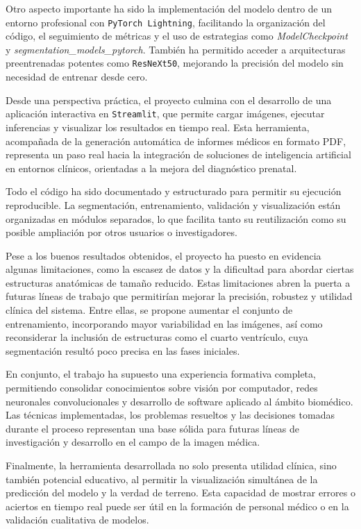 Otro aspecto importante ha sido la implementación del modelo dentro de un entorno profesional con \texttt{PyTorch Lightning}, facilitando la organización del código, el seguimiento de métricas y el uso de estrategias como \textit{ModelCheckpoint} y \textit{segmentation\_models\_pytorch}. También ha permitido acceder a arquitecturas preentrenadas potentes como \texttt{ResNeXt50}, mejorando la precisión del modelo sin necesidad de entrenar desde cero.


Desde una perspectiva práctica, el proyecto culmina con el desarrollo de una aplicación interactiva en \texttt{Streamlit}, que permite cargar imágenes, ejecutar inferencias y visualizar los resultados en tiempo real. Esta herramienta, acompañada de la generación automática de informes médicos en formato PDF, representa un paso real hacia la integración de soluciones de inteligencia artificial en entornos clínicos, orientadas a la mejora del diagnóstico prenatal.

Todo el código ha sido documentado y estructurado para permitir su ejecución reproducible. La segmentación, entrenamiento, validación y visualización están organizadas en módulos separados, lo que facilita tanto su reutilización como su posible ampliación por otros usuarios o investigadores.

Pese a los buenos resultados obtenidos, el proyecto ha puesto en evidencia algunas limitaciones, como la escasez de datos y la dificultad para abordar ciertas estructuras anatómicas de tamaño reducido. Estas limitaciones abren la puerta a futuras líneas de trabajo que permitirían mejorar la precisión, robustez y utilidad clínica del sistema. Entre ellas, se propone aumentar el conjunto de entrenamiento, incorporando mayor variabilidad en las imágenes, así como reconsiderar la inclusión de estructuras como el cuarto ventrículo, cuya segmentación resultó poco precisa en las fases iniciales.

En conjunto, el trabajo ha supuesto una experiencia formativa completa, permitiendo consolidar conocimientos sobre visión por computador, redes neuronales convolucionales y desarrollo de software aplicado al ámbito biomédico. Las técnicas implementadas, los problemas resueltos y las decisiones tomadas durante el proceso representan una base sólida para futuras líneas de investigación y desarrollo en el campo de la imagen médica.

Finalmente, la herramienta desarrollada no solo presenta utilidad clínica, sino también potencial educativo, al permitir la visualización simultánea de la predicción del modelo y la verdad de terreno. Esta capacidad de mostrar errores o aciertos en tiempo real puede ser útil en la formación de personal médico o en la validación cualitativa de modelos.




